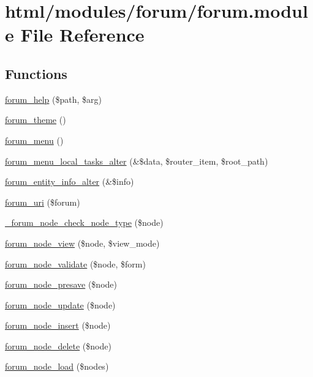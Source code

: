 \hypertarget{forum_8module}{
\section{html/modules/forum/forum.module File Reference}
\label{forum_8module}
}
\subsection*{Functions}
\begin{DoxyCompactItemize}
\item 
\hyperlink{forum_8module_a6b412760ac334421dcde78467c95c7d0}{forum\_\-help} (\$path, \$arg)
\item 
\hyperlink{forum_8module_afac3e683694ac93e71a52580010b9d76}{forum\_\-theme} ()
\item 
\hyperlink{forum_8module_a0421197a60856c7ee2cf2511f0d54ffc}{forum\_\-menu} ()
\item 
\hyperlink{forum_8module_accd00b70ccd698d011c35ac51a5307be}{forum\_\-menu\_\-local\_\-tasks\_\-alter} (\&\$data, \$router\_\-item, \$root\_\-path)
\item 
\hyperlink{forum_8module_a30c4ed7429841ff6f564f958a875e2e8}{forum\_\-entity\_\-info\_\-alter} (\&\$info)
\item 
\hyperlink{forum_8module_a2bccb8f9b59d9a2d8dab64cd67c012a0}{forum\_\-uri} (\$forum)
\item 
\hyperlink{forum_8module_ab7c8bc1867b60dfb765b3cfd80a7e4b7}{\_\-forum\_\-node\_\-check\_\-node\_\-type} (\$node)
\item 
\hyperlink{forum_8module_a76349348d79c1557db47ffe253587ffd}{forum\_\-node\_\-view} (\$node, \$view\_\-mode)
\item 
\hyperlink{forum_8module_a202ce86f99c3afcdfb99948161cff803}{forum\_\-node\_\-validate} (\$node, \$form)
\item 
\hyperlink{forum_8module_abb15dbd9bf5a680de97b16bff8b6bf0c}{forum\_\-node\_\-presave} (\$node)
\item 
\hyperlink{forum_8module_a47cdf4da38d9d8cfb4426850a300ad21}{forum\_\-node\_\-update} (\$node)
\item 
\hyperlink{forum_8module_a659bea74e419c7205f9f174973e742e9}{forum\_\-node\_\-insert} (\$node)
\item 
\hyperlink{forum_8module_a4fbf407b71fc0ec43d9730c279aef2f6}{forum\_\-node\_\-delete} (\$node)
\item 
\hyperlink{forum_8module_a4db7c947986e3cbbb6c81f247e53d7dd}{forum\_\-node\_\-load} (\$nodes)

\end{DoxyCompactItemize}
